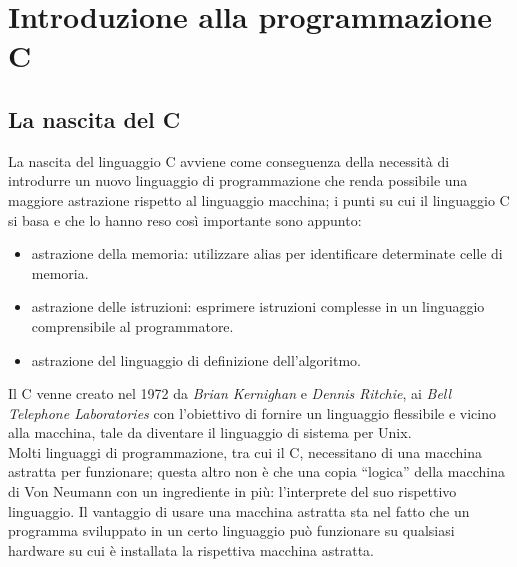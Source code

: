 \chapter{Introduzione alla programmazione C}

\section{La nascita del C}
La nascita del linguaggio C avviene come conseguenza della necessità di introdurre un nuovo linguaggio di programmazione che renda possibile una maggiore astrazione rispetto al linguaggio macchina; i punti su cui il linguaggio C si basa e che lo hanno reso così importante sono appunto:
\begin{itemize}[noitemsep]
	\item astrazione della memoria: utilizzare alias per identificare determinate celle di memoria.
	\item astrazione delle istruzioni: esprimere istruzioni complesse in un linguaggio comprensibile al programmatore.
	\item astrazione del linguaggio di definizione dell'algoritmo.
\end{itemize}
Il C venne creato nel 1972 da \textit{Brian Kernighan} e \textit{Dennis Ritchie}, ai \textit{Bell Telephone Laboratories} con l’obiettivo di fornire un linguaggio flessibile e vicino alla macchina, tale da diventare il linguaggio di sistema per Unix.\\
Molti linguaggi di programmazione, tra cui il C, necessitano di una macchina astratta per funzionare; questa altro non è che una copia “logica” della macchina di Von Neumann con un ingrediente in più: l’interprete del suo rispettivo linguaggio. Il vantaggio di usare una macchina astratta sta nel fatto che un programma sviluppato in un certo linguaggio può funzionare su qualsiasi hardware su cui è installata la rispettiva macchina astratta.


